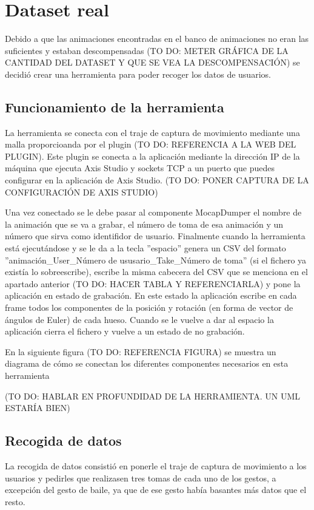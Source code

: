 \section{Dataset real}
\label{sec:datasetReal}
Debido a que las animaciones encontradas en el banco de animaciones no eran las suficientes y estaban descompensadas (TO DO: METER GRÁFICA DE LA CANTIDAD DEL DATASET Y QUE SE VEA LA DESCOMPENSACIÓN) se decidió crear una herramienta para poder recoger los datos de usuarios.

\subsection{Funcionamiento de la herramienta}
La herramienta se conecta con el traje de captura de movimiento mediante una malla proporcioanda por el plugin (TO DO: REFERENCIA A LA WEB DEL PLUGIN).
Este plugin se conecta a la aplicación mediante la dirección IP de la máquina que ejecuta Axis Studio y sockets TCP a un puerto que puedes configurar en la aplicación de Axis Studio. (TO DO: PONER CAPTURA DE LA CONFIGURACIÓN DE AXIS STUDIO)

Una vez conectado se le debe pasar al componente MocapDumper el nombre de la animación que se va a grabar, el número de toma de esa animación y un número que sirva como identifidor de usuario.
Finalmente cuando la herramienta está ejecutándose y se le da a la tecla ''espacio'' genera un CSV del formato ''animación\_User\_Número de ususario\_Take\_Número de toma'' (si el fichero ya existía lo sobreescribe), escribe la misma cabecera del CSV que se menciona en el apartado anterior (TO DO: HACER TABLA Y REFERENCIARLA) y pone la aplicación en estado de grabación.
En este estado la aplicación escribe en cada frame todos los componentes de la posición y rotación (en forma de vector de ángulos de Euler) de cada hueso.
Cuando se le vuelve a dar al espacio la aplicación cierra el fichero y vuelve a un estado de no grabación.

En la siguiente figura (TO DO: REFERENCIA FIGURA) se muestra un diagrama de cómo se conectan los diferentes componentes necesarios en esta herramienta

(TO DO: HABLAR EN PROFUNDIDAD DE LA HERRAMIENTA. UN UML ESTARÍA BIEN)

\subsection{Recogida de datos}
La recogida de datos consistió en ponerle el traje de captura de movimiento a los usuarios y pedirles que realizasen tres tomas de cada uno de los gestos, a excepción del gesto de baile, ya que de ese gesto había basantes más datos que el resto.

